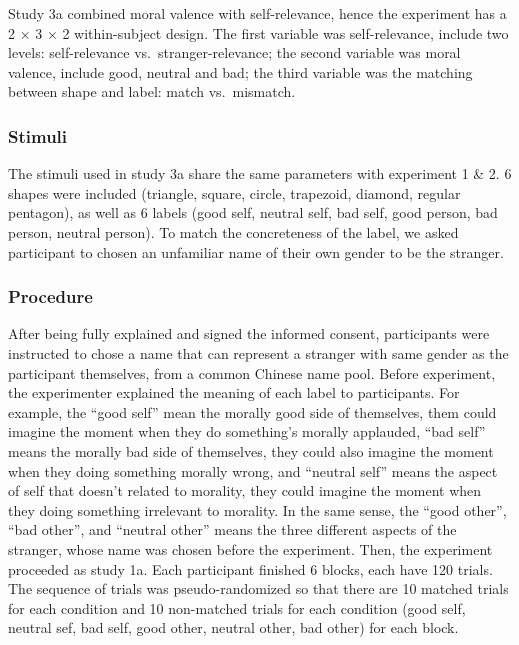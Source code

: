 \documentclass[man]{apa6}
\begin{document}
Study 3a combined moral valence with self-relevance, hence the experiment has a 2 × 3 × 2 within-subject design. The first variable was self-relevance, include two levels: self-relevance vs.~stranger-relevance; the second variable was moral valence, include good, neutral and bad; the third variable was the matching between shape and label: match vs.~mismatch.

\hypertarget{stimuli}{%
\subsubsection{Stimuli}\label{stimuli}}

The stimuli used in study 3a share the same parameters with experiment 1 \& 2. 6 shapes were included (triangle, square, circle, trapezoid, diamond, regular pentagon), as well as 6 labels (good self, neutral self, bad self, good person, bad person, neutral person). To match the concreteness of the label, we asked participant to chosen an unfamiliar name of their own gender to be the stranger.

\hypertarget{procedure-4}{%
\subsubsection{Procedure}\label{procedure-4}}

After being fully explained and signed the informed consent, participants were instructed to chose a name that can represent a stranger with same gender as the participant themselves, from a common Chinese name pool. Before experiment, the experimenter explained the meaning of each label to participants. For example, the \enquote{good self} mean the morally good side of themselves, them could imagine the moment when they do something's morally applauded, \enquote{bad self} means the morally bad side of themselves, they could also imagine the moment when they doing something morally wrong, and \enquote{neutral self} means the aspect of self that doesn't related to morality, they could imagine the moment when they doing something irrelevant to morality. In the same sense, the \enquote{good other}, \enquote{bad other}, and \enquote{neutral other} means the three different aspects of the stranger, whose name was chosen before the experiment. Then, the experiment proceeded as study 1a. Each participant finished 6 blocks, each have 120 trials. The sequence of trials was pseudo-randomized so that there are 10 matched trials for each condition and 10 non-matched trials for each condition (good self, neutral sef, bad self, good other, neutral other, bad other) for each block.
\end{document}
